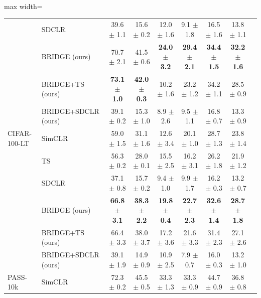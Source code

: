 \begin{table}[t]
\begin{adjustbox}{max width=\textwidth}
\begin{tabular}{l l c c c c c c c}
 & SDCLR & 39.6 {\scriptsize$\pm$ 1.1} & 15.6 {\scriptsize$\pm$ 0.2} & 12.0 {\scriptsize$\pm$ 1.6} & 9.1 {\scriptsize$\pm$ 1.8} & 16.5 {\scriptsize$\pm$ 1.6} & 13.8 {\scriptsize$\pm$ 1.1} \\
 & BRIDGE (ours) & 70.7 {\scriptsize$\pm$ 2.1} & 41.5 {\scriptsize$\pm$ 0.6} & \textbf{24.0 {\scriptsize$\pm$ 3.2}} & \textbf{29.4 {\scriptsize$\pm$ 2.1}} & \textbf{34.4 {\scriptsize$\pm$ 1.5}} & \textbf{32.2 {\scriptsize$\pm$ 1.6}} \\
 & BRIDGE+TS (ours) & \textbf{73.1 {\scriptsize$\pm$ 1.0}} & \textbf{42.0 {\scriptsize$\pm$ 0.3}} & 10.2 {\scriptsize$\pm$ 1.6} & 23.2 {\scriptsize$\pm$ 1.2} & 34.2 {\scriptsize$\pm$ 1.1} & 28.5 {\scriptsize$\pm$ 0.9} \\
 & BRIDGE+SDCLR (ours) & 39.1 {\scriptsize$\pm$ 0.2} & 15.3 {\scriptsize$\pm$ 1.0} & 8.9 {\scriptsize$\pm$ 2.6} & 9.5 {\scriptsize$\pm$ 1.1} & 16.8 {\scriptsize$\pm$ 0.7} & 13.3 {\scriptsize$\pm$ 0.9} \\
\midrule
CIFAR-100-LT & SimCLR & 59.0 {\scriptsize$\pm$ 1.5} & 31.1 {\scriptsize$\pm$ 1.6} & 12.6 {\scriptsize$\pm$ 3.4} & 20.1 {\scriptsize$\pm$ 1.0} & 28.7 {\scriptsize$\pm$ 1.3} & 23.8 {\scriptsize$\pm$ 1.4} \\
 & TS & 56.3 {\scriptsize$\pm$ 0.2} & 28.0 {\scriptsize$\pm$ 0.1} & 15.5 {\scriptsize$\pm$ 2.5} & 16.2 {\scriptsize$\pm$ 3.1} & 26.2 {\scriptsize$\pm$ 1.8} & 21.9 {\scriptsize$\pm$ 1.2} \\
 & SDCLR & 37.1 {\scriptsize$\pm$ 0.8} & 15.7 {\scriptsize$\pm$ 0.2} & 9.4 {\scriptsize$\pm$ 1.0} & 9.9 {\scriptsize$\pm$ 1.7} & 16.2 {\scriptsize$\pm$ 0.3} & 13.2 {\scriptsize$\pm$ 0.7} \\
 & BRIDGE (ours) & \textbf{66.8 {\scriptsize$\pm$ 3.1}} & \textbf{38.3 {\scriptsize$\pm$ 2.2}} & \textbf{19.8 {\scriptsize$\pm$ 0.4}} & \textbf{22.7 {\scriptsize$\pm$ 2.3}} & \textbf{32.6 {\scriptsize$\pm$ 1.4}} & \textbf{28.7 {\scriptsize$\pm$ 1.8}} \\
 & BRIDGE+TS (ours) & 66.4 {\scriptsize$\pm$ 3.3} & 38.0 {\scriptsize$\pm$ 3.7} & 17.2 {\scriptsize$\pm$ 3.6} & 21.6 {\scriptsize$\pm$ 3.3} & 31.4 {\scriptsize$\pm$ 2.3} & 27.1 {\scriptsize$\pm$ 2.6} \\
 & BRIDGE+SDCLR (ours) & 39.1 {\scriptsize$\pm$ 1.9} & 14.9 {\scriptsize$\pm$ 0.9} & 10.9 {\scriptsize$\pm$ 2.5} & 7.9 {\scriptsize$\pm$ 0.7} & 16.0 {\scriptsize$\pm$ 0.3} & 13.2 {\scriptsize$\pm$ 1.0} \\
\midrule
PASS-10k & SimCLR & 72.3 {\scriptsize$\pm$ 0.2} & 45.5 {\scriptsize$\pm$ 0.5} & 33.3 {\scriptsize$\pm$ 1.3} & 33.3 {\scriptsize$\pm$ 0.9} & 44.7 {\scriptsize$\pm$ 0.9} & 36.8 {\scriptsize$\pm$ 0.8} \\

\end{tabular}
\end{adjustbox}
\end{table}

